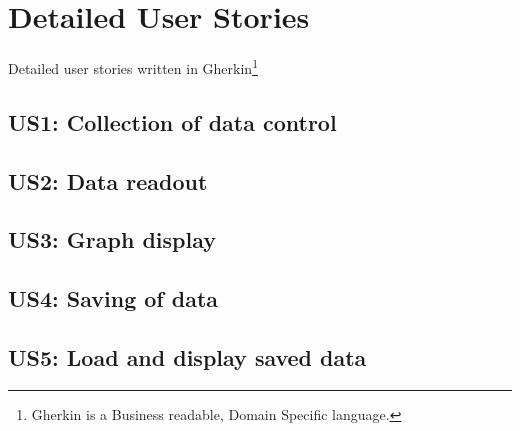 \section{Detailed User Stories}

Detailed user stories written in Gherkin\footnote{Gherkin is a Business readable, Domain Specific language.}\cite{GherkinDescription}

\subsection{US1: Collection of data control}


\subsection{US2: Data readout}


\subsection{US3: Graph display}


\subsection{US4: Saving of data}


\subsection{US5: Load and display saved data}



